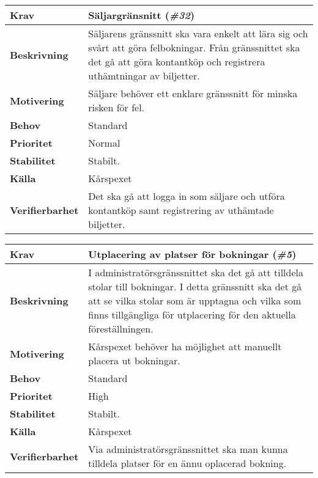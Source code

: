 \documentclass[a4paper, twoside, 11pt, titlepage]{article}
\begin{document}
		\begin{tabular} { p{2.6cm} p{12.5cm} }
			\hline
			\sffamily\textbf{Krav} & Säljargränsnitt (\emph{\#32})  \\
			\hline
			\sffamily\textbf{Beskrivning} & Säljarens gränssnitt ska vara enkelt att lära sig och svårt att göra felbokningar. Från gränssnittet ska det gå att göra kontantköp och registrera uthämtningar av biljetter.  \\
			\hline
			\sffamily\textbf{Motivering} & Säljare behöver ett enklare gränssnitt för minska risken för fel.  \\
			\hline
			\sffamily\textbf{Behov} & Standard  \\
			\hline
			\sffamily\textbf{Prioritet} & Normal  \\
			\hline
			\sffamily\textbf{Stabilitet} & Stabilt.  \\
			\hline
			\sffamily\textbf{Källa} & Kårspexet  \\
			\hline
			\sffamily\textbf{Verifierbarhet} & Det ska gå att logga in som säljare och utföra kontantköp samt registrering av uthämtade biljetter.  \\
			\hline
		\end{tabular}
		\vspace{6mm}

		\begin{tabular} { p{2.6cm} p{12.5cm} }
			\hline
			\sffamily\textbf{Krav} & Utplacering av platser för bokningar (\emph{\#5})  \\
			\hline
			\sffamily\textbf{Beskrivning} & I administratörsgränssnittet ska det gå att tilldela stolar till bokningar. I detta gränssnitt ska det gå att se vilka stolar som är upptagna och vilka som finns tillgängliga för utplacering för den aktuella föreställningen.  \\
			\hline
			\sffamily\textbf{Motivering} & Kårspexet behöver ha möjlighet att manuellt placera ut bokningar.  \\
			\hline
			\sffamily\textbf{Behov} & Standard  \\
			\hline
			\sffamily\textbf{Prioritet} & High  \\
			\hline
			\sffamily\textbf{Stabilitet} & Stabilt.  \\
			\hline
			\sffamily\textbf{Källa} & Kårspexet  \\
			\hline
			\sffamily\textbf{Verifierbarhet} & Via administratörsgränssnittet ska man kunna tilldela platser för en ännu oplacerad bokning.  \\
			\hline
		\end{tabular}
		\vspace{6mm}
\end{document}
